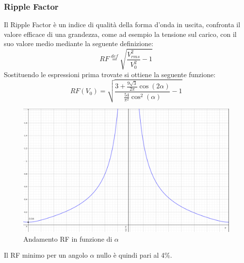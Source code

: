 \documentclass[a4paper,10pt]{article}
\begin{document}
\subsubsection{Ripple Factor}
Il Ripple Factor è un indice di qualità della forma d'onda in uscita, confronta
il valore efficace di una grandezza, come ad esempio la tensione sul carico, con il 
suo valore medio mediante la seguente definizione:
\begin{equation}
 RF \stackrel{def}{=} \sqrt{\frac{V_{rms}^2}{V_0^2}-1}
 \label{eq:ripple_factor}
\end{equation}
Sostituendo le espressioni prima trovate si ottiene la seguente funzione:
\begin{equation*}
 RF(V_0) = \sqrt{\frac{3+\frac{9\sqrt{3}}{2\pi}\cos(2\alpha)}{\frac{54}{\pi^2}\cos^2(\alpha)}-1}
\end{equation*}
\begin{figure}[H]
 \centering
 \includegraphics[keepaspectratio=true,width=0.9\linewidth]
 {RFV_0.png}
 \caption{Andamento RF in funzione di \(\alpha\)}
\end{figure}
Il RF minimo per un angolo \(\alpha\) nullo è quindi pari al 4\%.
\end{document}
